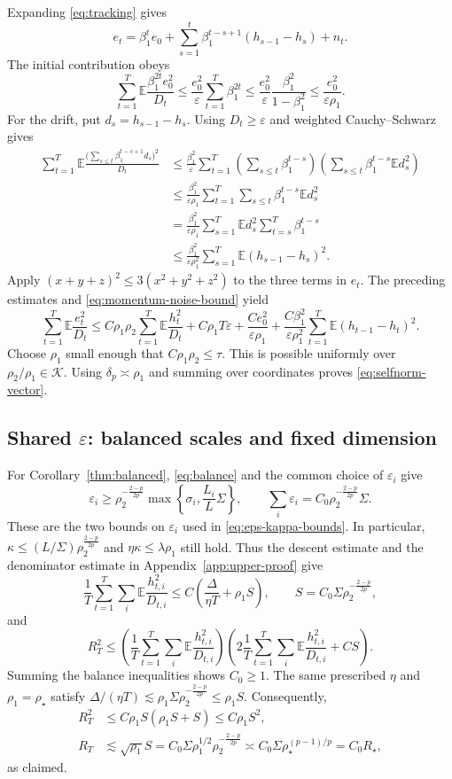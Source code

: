 \documentclass[11pt,letterpaper]{article}
\theoremstyle{definition}
\newcommand{\E}{\mathbb E}
\newcommand{\eps}{\varepsilon}
\begin{document}
Expanding \eqref{eq:tracking} gives
\[
e_t=\beta_1^te_0+
\sum_{s=1}^t\beta_1^{t-s+1}(h_{s-1}-h_s)+n_t.
\]
The initial contribution obeys
\[
\sum_{t=1}^T\E\frac{\beta_1^{2t}e_0^2}{D_t}
\le\frac{e_0^2}{\eps}\sum_{t=1}^T\beta_1^{2t}
\le\frac{e_0^2}{\eps}\frac{\beta_1^2}{1-\beta_1^2}
\le\frac{e_0^2}{\eps\rho_1}.
\]
For the drift, put $d_s=h_{s-1}-h_s$. Using $D_t\ge\eps$ and
weighted Cauchy--Schwarz gives
\begin{align*}
\sum_{t=1}^T\E
\frac{\bigl(\sum_{s\le t}\beta_1^{t-s+1}d_s\bigr)^2}{D_t}
&\le\frac{\beta_1^2}{\eps}\sum_{t=1}^T
\left(\sum_{s\le t}\beta_1^{t-s}\right)
\left(\sum_{s\le t}\beta_1^{t-s}\E d_s^2\right)\\
&\le\frac{\beta_1^2}{\eps\rho_1}
\sum_{t=1}^T\sum_{s\le t}\beta_1^{t-s}
\E d_s^2\\
&=\frac{\beta_1^2}{\eps\rho_1}
\sum_{s=1}^T\E d_s^2\sum_{t=s}^T\beta_1^{t-s}\\
&\le\frac{\beta_1^2}{\eps\rho_1^2}
\sum_{s=1}^T\E(h_{s-1}-h_s)^2.
\end{align*}
Apply $(x+y+z)^2\le3(x^2+y^2+z^2)$ to the three terms in $e_t$.
The preceding estimates and \eqref{eq:momentum-noise-bound} yield
\[
\sum_{t=1}^T\E\frac{e_t^2}{D_t}
\le C\rho_1\rho_2\sum_{t=1}^T\E\frac{h_t^2}{D_t}
+C\rho_1T\eps+\frac{Ce_0^2}{\eps\rho_1}
+\frac{C\beta_1^2}{\eps\rho_1^2}
\sum_{t=1}^T\E(h_{t-1}-h_t)^2.
\]
Choose $\rho_1$ small enough that $C\rho_1\rho_2\le\tau$.
This is possible uniformly over $\rho_2/\rho_1\in\mathcal K$.
Using $\delta_p\asymp\rho_1$ and summing over coordinates proves
\eqref{eq:selfnorm-vector}.

\subsection{Shared \texorpdfstring{$\eps$}{epsilon}: balanced scales and fixed dimension}
\label{app:corollaries}

For Corollary~\ref{thm:balanced}, \eqref{eq:balance} and the common choice of $\eps_i$ give
\[
\eps_i\ge\rho_2^{-\frac{2-p}{2p}}
\max\left\{\sigma_i,\frac{L_i}{L}\Sigma\right\},
\qquad
\sum_i\eps_i=C_0\rho_2^{-\frac{2-p}{2p}}\Sigma.
\]
These are the two bounds on $\eps_i$ used in
\eqref{eq:eps-kappa-bounds}. In particular,
$\kappa\le(L/\Sigma)\rho_2^{\frac{2-p}{2p}}$ and
$\eta\kappa\le\lambda\rho_1$ still hold. Thus the descent estimate and
the denominator estimate in Appendix~\ref{app:upper-proof} give
\[
\frac1T\sum_{t=1}^T\sum_i\E\frac{h_{t,i}^2}{D_{t,i}}
\le C\left(\frac{\Delta}{\eta T}+\rho_1S\right),
\qquad S=C_0\Sigma\rho_2^{-\frac{2-p}{2p}},
\]
and
\[
R_T^2\le
\left(\frac1T\sum_{t=1}^T\sum_i\E\frac{h_{t,i}^2}{D_{t,i}}\right)
\left(2\frac1T\sum_{t=1}^T\sum_i
\E\frac{h_{t,i}^2}{D_{t,i}}+CS\right).
\]
Summing the balance inequalities shows $C_0\ge1$. The same prescribed
$\eta$ and $\rho_1=\rho_\star$ satisfy
$\Delta/(\eta T)\lesssim\rho_1\Sigma\rho_2^{-\frac{2-p}{2p}}\le\rho_1S$.
Consequently,
\begin{align*}
R_T^2&\le C\rho_1S(\rho_1S+S)\le C\rho_1S^2,\\
R_T&\lesssim\sqrt{\rho_1}S
=C_0\Sigma\rho_1^{1/2}\rho_2^{-\frac{2-p}{2p}}
\asymp C_0\Sigma\rho_\star^{(p-1)/p}=C_0R_\star,
\end{align*}
as claimed.
\end{document}
